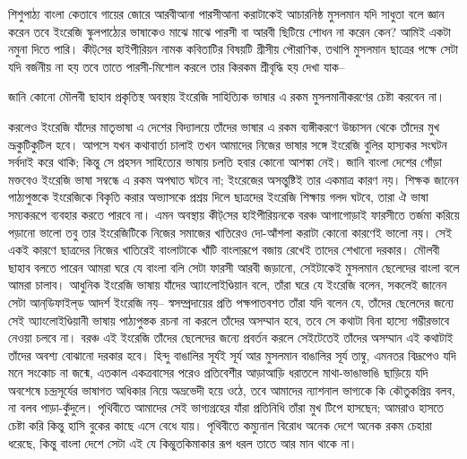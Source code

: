 \documentclass[a4paper,11pt]{article}
\begin{document}
\begin{multicols}{3}
{\begin{spacing}{1.15}
শিশুপাঠ্য বাংলা কেতাবে গায়ের জোরে আরবীআনা পারসীআনা করাটাকেই আচারনিষ্ঠ মুসলমান যদি সাধুতা বলে জ্ঞান করেন তবে ইংরেজি স্কুলপাঠ্যের ভাষাকেও মাঝে মাঝে পারসী বা আরবী ছিটিয়ে শোধন না করেন কেন? আমিই একটা নমুনা দিতে পারি। কীট্‌সের হাইপীরিয়ন নামক কবিতাটির বিষয়টি গ্রীসীয় পৌরাণিক, তথাপি মুসলমান ছাত্রের পক্ষে সেটা যদি বর্জনীয় না হয় তবে তাতে পারসী-মিশোল করলে তার কিরকম শ্রীবৃদ্ধি হয় দেখা যাক--
\begin{large}
\color{pink}{
\enit 
Deep in the Saya-i-ghamagin of a vale,
Far sunken from the nafas-i-hayat afza-i-morn,
Far from the atshin noon and eve's one star,
Sat bamoo-i-safid Saturn Khamush as a Sang।}
\end{large}
জানি কোনো মৌলবী ছাহাব প্রকৃতিস্থ অবস্থায় ইংরেজি সাহিত্যিক ভাষার এ রকম মুসলমানীকরণের চেষ্টা করবেন না।  

\begin{window} \bn করলেও ইংরেজি যাঁদের মাতৃভাষা এ দেশের বিদ্যালয়ে তাঁদের ভাষার এ রকম ব্যঙ্গীকরণে উচ্চাসন থেকে তাঁদের মুখ ভ্রূকুটিকুটিল হবে। আপসে যখন কথাবার্তা চালাই তখন আমাদের নিজের ভাষার সঙ্গে ইংরেজি বুলির হাস্যকর সংঘটন সর্বদাই করে থাকি; কিন্তু সে প্রহসন সাহিত্যের ভাষায় চলতি হবার কোনো আশঙ্কা নেই। জানি বাংলা দেশের গোঁড়া মক্তবেও ইংরেজি ভাষা সম্বন্ধে এ রকম অপঘাত ঘটবে না; ইংরেজের অসন্তুষ্টিই তার একমাত্র কারণ নয়। শিক্ষক জানেন পাঠ্যপুস্তকে ইংরেজিকে বিকৃতি করার অভ্যাসকে প্রশ্রয় দিলে ছাত্রদের ইংরেজি শিক্ষায় গলদ ঘটবে, তারা ঐ ভাষা সম্যকরূপে ব্যবহার করতে পারবে না। এমন অবস্থায় কীট্‌সের হাইপীরিয়নকে বরঞ্চ আগাগোড়াই ফারসীতে তর্জমা করিয়ে পড়ানো ভালো তবু তার ইংরেজিটিকে নিজের সমাজের খাতিরেও দো-আঁশলা করাটা কোনো কারণেই ভালো নয়। সেই একই কারণে ছাত্রদের নিজের খাতিরেই বাংলাটাকে খাঁটি বাংলারূপে বজায় রেখেই তাদের শেখানো দরকার। মৌলবী ছাহাব বলতে পারেন আমরা ঘরে যে বাংলা বলি সেটা ফারসী আরবী জড়ানো, সেইটাকেই মুসলমান ছেলেদের বাংলা বলে আমরা চালাব। আধুনিক ইংরেজি ভাষায় যাঁদের অ্যাংলোইণ্ডিয়ান বলে, তাঁরা ঘরে যে ইংরেজি বলেন, সকলেই জানেন সেটা আন্‌ডিফাইল্‌ড আদর্শ ইংরেজি নয়-- স্বসম্প্রদায়ের প্রতি পক্ষপাতবশত তাঁরা যদি বলেন যে, তাঁদের ছেলেদের জন্যে সেই অ্যাংলোইণ্ডিয়ানী ভাষায় পাঠ্যপুস্তক রচনা না করলে তাঁদের অসম্মান হবে, তবে সে কথাটা বিনা হাস্যে গম্ভীরভাবে নেওয়া চলবে না। বরঞ্চ এই ইংরেজি তাঁদের ছেলেদের জন্যে প্রবর্তন করলে সেইটেতেই তাঁদের অসম্মান এই কথাটাই তাঁদের অবশ্য বোঝানো দরকার হবে। হিন্দু বাঙালির সূর্যই সূর্য আর মুসলমান বাঙালির সূর্য তাম্বু, এমনতর বিদ্রূপেও যদি মনে সংকোচ না জন্মে, এতকাল একত্রবাসের পরেও প্রতিবেশীর আড়াআড়ি ধরাতলে মাথা-ভাঙাভাঙি ছাড়িয়ে যদি অবশেষে চন্দ্রসূর্যের ভাষাগত অধিকার নিয়ে অভ্রভেদী হয়ে ওঠে, তবে আমাদের ন্যাশনাল ভাগ্যকে কি কৌতুকপ্রিয় বলব, না বলব পাড়া-কুঁদুলে। পৃথিবীতে আমাদের সেই ভাগ্যগ্রহের যাঁরা প্রতিনিধি তাঁরা মুখ টিপে হাসছেন; আমরাও হাসতে চেষ্টা করি কিন্তু হাসি বুকের কাছে এসে বেধে যায়। পৃথিবীতে কম্যুনাল বিরোধ অনেক দেশে অনেক রকম চেহারা ধরেছে, কিন্তু বাংলা দেশে সেটা এই যে কিম্ভুতকিমাকার রূপ ধরল তাতে আর মান থাকে না।   
\end{window}
\end{spacing}
\closearticle


}
\end{multicols}
\end{document}
